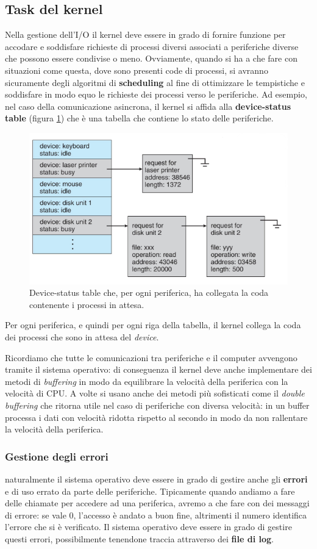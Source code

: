 \subsection{Task del kernel}
Nella gestione dell'I/O il kernel deve essere in grado di fornire funzione per accodare e soddisfare richieste di processi diversi associati a periferiche diverse che possono essere condivise o meno. Ovviamente, quando si ha a che fare con situazioni come questa, dove sono presenti code di processi, si avranno sicuramente degli algoritmi di \textbf{scheduling} al fine di ottimizzare le tempistiche e soddisfare in modo equo le richieste dei processi verso le periferiche. Ad esempio, nel caso della comunicazione asincrona, il kernel si affida alla \textbf{device-status table} (figura \ref{fig:device-status table}) che è una tabella che contiene lo stato delle periferiche.
\begin{figure}[h]
    \centering
    \includegraphics[width = .65\textwidth]{../res/imgs/IO system/device-status table.png}
    \caption{Device-status table che, per ogni periferica, ha collegata la coda contenente i processi in attesa.}
    \label{fig:device-status table}
\end{figure}
Per ogni periferica, e quindi per ogni riga della tabella, il kernel collega la coda dei processi che sono in attesa del \textit{device}.

Ricordiamo che tutte le comunicazioni tra periferiche e il computer avvengono tramite il sistema operativo: di conseguenza il kernel deve anche implementare dei metodi di \textit{buffering} in modo da equilibrare la velocità della periferica con la velocità di CPU. A volte si usano anche dei metodi più sofisticati come il \textit{double buffering} che ritorna utile nel caso di periferiche con diversa velocità: in un buffer processa i dati con velocità ridotta rispetto al secondo in modo da non rallentare la velocità della periferica. 

\subsubsection{Gestione degli errori}
naturalmente il sistema operativo deve essere in grado di gestire anche gli \textbf{errori} e di uso errato da parte delle periferiche. Tipicamente quando andiamo a fare delle chiamate per accedere ad una periferica, avremo a che fare con dei messaggi di errore: se vale 0, l'accesso è andato a buon fine, altrimenti il numero identifica l'errore che si è verificato. Il sistema operativo deve essere in grado di gestire questi errori, possibilmente tenendone traccia attraverso dei \textbf{file di log}. 

